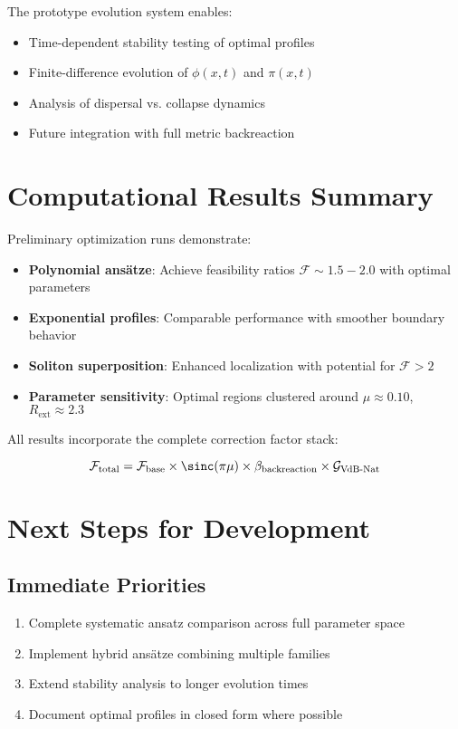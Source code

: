 \documentclass[12pt,a4paper]{article}
\begin{document}
The prototype evolution system enables:

\begin{itemize}
\item Time-dependent stability testing of optimal profiles
\item Finite-difference evolution of $\phi(x,t)$ and $\pi(x,t)$
\item Analysis of dispersal vs. collapse dynamics
\item Future integration with full metric backreaction
\end{itemize}

\section{Computational Results Summary}

Preliminary optimization runs demonstrate:

\begin{itemize}
\item \textbf{Polynomial ansätze}: Achieve feasibility ratios $\mathcal{F} \sim 1.5-2.0$ with optimal parameters
\item \textbf{Exponential profiles}: Comparable performance with smoother boundary behavior  
\item \textbf{Soliton superposition}: Enhanced localization with potential for $\mathcal{F} > 2$
\item \textbf{Parameter sensitivity}: Optimal regions clustered around $\mu \approx 0.10$, $R_{\text{ext}} \approx 2.3$
\end{itemize}

All results incorporate the complete correction factor stack:

\begin{equation}
\mathcal{F}_{\text{total}} = \mathcal{F}_{\text{base}} \times \sinc(\pi\mu) \times \beta_{\text{backreaction}} \times \mathcal{G}_{\text{VdB-Nat}}
\end{equation}

\section{Next Steps for Development}

\subsection{Immediate Priorities}

\begin{enumerate}
\item Complete systematic ansatz comparison across full parameter space
\item Implement hybrid ansätze combining multiple families
\item Extend stability analysis to longer evolution times
\item Document optimal profiles in closed form where possible
\end{enumerate}
\end{document}
